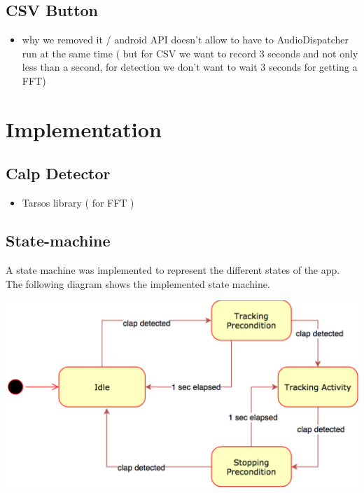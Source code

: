 \documentclass
[
 12pt, %
       DIV12,
       a4paper,
       oneside,
       titlepage,
       parskip=half,
       headings=normal,
       listof=totoc,
       bibliography=totoc,
       index=totoc,
       captions=tableheading,
       ]{scrreprt}
\begin{document}
\subsection{CSV Button}
\label{sec:org020604d}
\begin{itemize}
\item why we removed it / android API doesn't allow to have to AudioDispatcher run
at the same time ( but for CSV we want to record 3 seconds and not only less
than a second, for detection we don't want to wait 3 seconds for getting a FFT)
\end{itemize}

\section{Implementation}
\label{sec:orgd17f5ad}
\subsection{Calp Detector}
\label{sec:org9ae6af9}
\begin{itemize}
\item Tarsos library ( for FFT )
\end{itemize}
\subsection{State-machine}
\label{sec:orgf5ddf22}
A state machine was implemented to represent the different states of the app.
The following diagram shows the implemented state machine.

\begin{center}
\includegraphics[width=.9\linewidth]{./imgs/statemachine.png}
\end{center}
\end{document}
